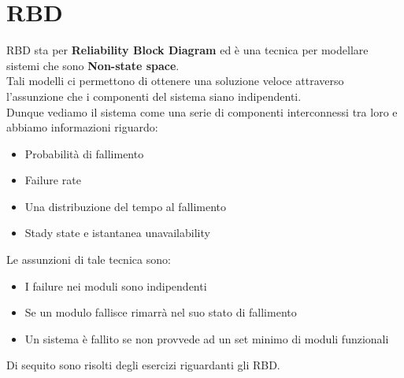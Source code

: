 \chapter{RBD}
RBD sta per \textbf{Reliability Block Diagram} ed è una tecnica per modellare sistemi che sono \textbf{Non-state space}.\\
Tali modelli ci permettono di ottenere una soluzione veloce attraverso l'assunzione che i componenti del sistema siano indipendenti.\\
Dunque vediamo il sistema come una serie di componenti interconnessi tra loro e abbiamo informazioni riguardo:
\begin{itemize}
    \item Probabilità di fallimento
    \item Failure rate
    \item Una distribuzione del tempo al fallimento 
    \item Stady state e istantanea unavailability
\end{itemize}
Le assunzioni di tale tecnica sono:
\begin{itemize}
    \item I failure nei moduli sono indipendenti
    \item Se un modulo fallisce rimarrà nel suo stato di fallimento
    \item Un sistema è fallito se non provvede ad un set minimo di moduli funzionali
\end{itemize}
Di sequito sono risolti degli esercizi riguardanti gli RBD.
